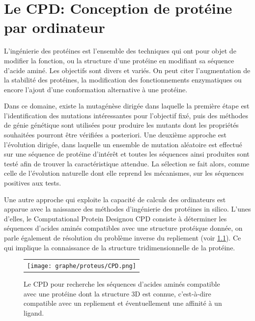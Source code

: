 
\chapter{Le \og CPD\fg: Conception de protéine par ordinateur}
\label{chap:CPD}

L'ingénierie des protéines est l'ensemble des techniques qui ont pour objet de modifier la fonction, ou la structure d'une protéine en modifiant sa séquence d'acide aminé. Les objectifs sont divers et variés. On peut citer l'augmentation de la stabilité des protéines, la  modification des fonctionnements enzymatiques ou encore l'ajout d'une conformation alternative à une protéine.

Dans ce domaine, existe la mutagénèse dirigée dans laquelle la première étape est l'identification des mutations intéressantes pour l'objectif fixé, puis des méthodes de génie génétique sont utilisées pour produire les mutants dont les propriétés souhaitées pourront être vérifiées a posteriori. Une deuxième approche est l'évolution dirigée, dans laquelle un ensemble de mutation aléatoire est effectué sur une séquence de protéine d'intérêt et toutes les séquences ainsi produites sont testé afin de trouver la caractéristique attendue. La sélection se fait alors, comme celle de l'évolution naturelle dont elle reprend les mécanismes, sur les séquences positives aux tests.



Une autre approche qui exploite la capacité de calculs des ordinateurs est apparue avec la naissance des méthodes d'ingénierie des protéines \og in silico\fg. L'unes d'elles, le \og Computational Protein Design\fg ou CPD consiste à déterminer les séquences d'acides aminés compatibles avec une structure protéique donnée, on parle également de résolution du problème inverse du repliement (voir \ref{graph:CPD}). Ce qui implique la connaissance de la structure tridimensionnelle de la protéine. 

   \begin{figure}[!htbp]
     \centering
     \begin{tabular}{c}
       \texttt{[image: graphe/proteus/CPD.png]} &
     \end{tabular}
     
     \caption{Le CPD pour \og {}\fg recherche les séquences d'acides aminés compatible avec une protéine dont la structure 3D  est connue, c'est-à-dire compatible avec un repliement et éventuellement une affinité à un ligand.}
\label{graph:CPD}
   \end{figure}


